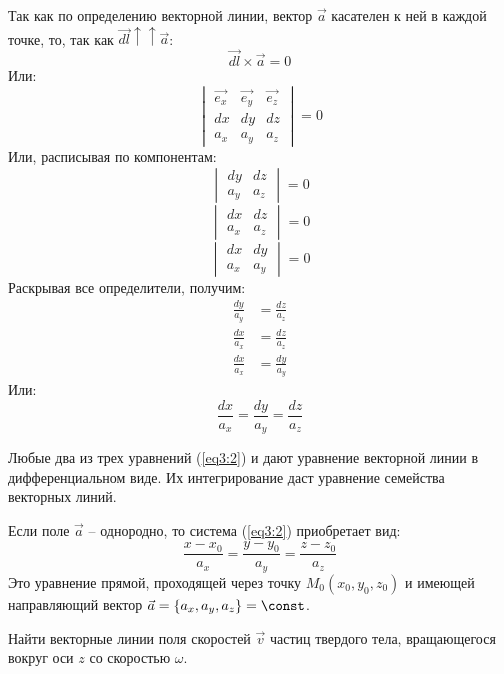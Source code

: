 	Так как по определению векторной линии, вектор \( \vec{a} \) касателен к ней в каждой точке, то, так как \( \vec{dl} \uparrow\uparrow \vec{a} \):
	\begin{equation}
		\vec{dl} \times \vec{a} = 0 \label{eq3:1}
	\end{equation}
	Или:
	\[ \begin{vmatrix}
		\vec{e_x}	& \vec{e_y}	& \vec{e_z} \\
		dx 			& dy 			& dz \\
		a_x 		& a_y 			& a_z
	\end{vmatrix} = 0 \]
	Или, расписывая по компонентам:
	\[ \begin{vmatrix}
			dy		& dz   \\
			a_y 	& a_z
		\end{vmatrix} = 0 \]
	\[ \begin{vmatrix}
			dx		& dz   \\
			a_x 	& a_z
		\end{vmatrix} = 0 \]
	\[ \begin{vmatrix}
			dx		& dy   \\
			a_x 	& a_y
		\end{vmatrix} = 0 \]
	Раскрывая все определители, получим:
	\begin{align}
		\frac{dy}{a_y} & = \frac{dz}{a_z} \nonumber \\
		\frac{dx}{a_x} & = \frac{dz}{a_z} \nonumber \\
		\frac{dx}{a_x} & = \frac{dy}{a_y} \nonumber
	\end{align}
	Или:
	\begin{equation}
		\frac{dx}{a_x} = \frac{dy}{a_y} = \frac{dz}{a_z} \label{eq3:2} 
	\end{equation}
	
	Любые два из трех уравнений (\ref{eq3:2}) и дают уравнение векторной линии в дифференциальном виде. Их интегрирование даст уравнение семейства векторных линий.
	
	Если поле \( \vec{a} \) -- однородно, то система (\ref{eq3:2}) приобретает вид:
	\begin{equation}
		\frac{x-x_0}{a_x} = \frac{y-y_0}{a_y} = \frac{z-z_0}{a_z} \nonumber
	\end{equation}
	Это уравнение прямой, проходящей через точку \( M_0 (x_0, y_0, z_0) \)  и имеющей направляющий вектор \( \vec{a} = \{ a_x, a_y, a_z \} = \const \).
	
	\begin{example}
	Найти векторные линии поля скоростей \( \vec{v} \) частиц твердого тела, вращающегося вокруг оси \( z \) со скоростью \( \omega \).
	\end{example}
	
